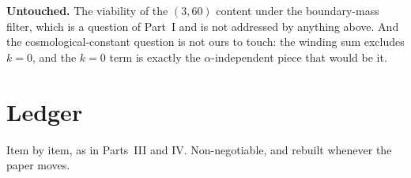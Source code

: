 \documentclass[11pt,a4paper]{article}
\begin{document}
\textbf{Untouched.} The viability of the $(3,60)$ content under the boundary-mass filter, which is a
question of Part~I and is not addressed by anything above. And the cosmological-constant question is
not ours to touch: the winding sum excludes $k=0$, and the $k=0$ term is exactly the
$\alpha$-independent piece that would be it.

\section{Ledger}\label{sec:ledger}

Item by item, as in Parts~III and IV. Non-negotiable, and rebuilt whenever the paper moves.

\begingroup\small
\renewcommand{\arraystretch}{0.90}  %
\setlength{\LTpre}{4pt}\setlength{\LTpost}{4pt}
\end{document}
